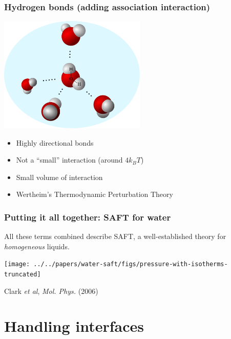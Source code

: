 \begin{frame}
  \frametitle{Hydrogen bonds (adding association interaction)}
  \vspace{-2em}
  \hfill\includegraphics[width=7cm]{figs/hydrogen-bonds}\hspace{-3em}
  \vspace{-2em}
  \begin{itemize}
  \item Highly directional bonds
  \item Not a ``small'' interaction (around $4k_BT$)
  \item Small volume of interaction
  \item Wertheim's Thermodynamic Perturbation Theory\\ \hfill
  \end{itemize}
\end{frame}

\begin{frame}
  \frametitle{Putting it all together:  SAFT for water}
  All these terms combined describe SAFT, a well-established theory
  for \emph{homogeneous} liquids.
  \begin{center}
    \vspace{-1em}
    \texttt{[image: ../../papers/water-saft/figs/pressure-with-isotherms-truncated]}
  \end{center}
  \hfill Clark \emph{et al}, \emph{Mol. Phys.}
  (2006)
\end{frame}

\section{Handling interfaces}

